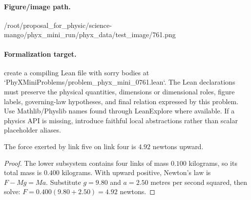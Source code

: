 \paragraph{Figure/image path.}
/root/proposal\_for\_physic/science-mango/phyx\_mini\_run/phyx\_data/test\_image/761.png

\paragraph{Formalization target.}
create a compiling Lean file with sorry bodies at `PhyXMiniProblems/problem\_phyx\_mini\_0761.lean`. The Lean declarations must preserve the physical quantities, dimensions or dimensional roles, figure labels, governing-law hypotheses, and final relation expressed by this problem.
Use Mathlib/Physlib names found through LeanExplore where available. If a physics API is missing, introduce faithful local abstractions rather than scalar placeholder aliases.

\begin{theorem}
\label{thm:physics:phyx_mini_0761:target}
The force exerted by link five on link four is $4.92$ newtons upward.
\end{theorem}
\begin{proof}
The lower subsystem contains four links of mass $0.100$ kilograms, so its total mass is $0.400$ kilograms.  With upward positive, Newton's law is $F-Mg=Ma$.  Substitute $g=9.80$ and $a=2.50$ metres per second squared, then solve: $F=0.400(9.80+2.50)=4.92$ newtons.
\end{proof}


